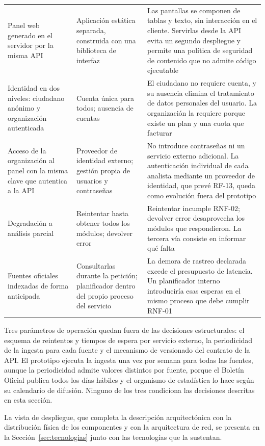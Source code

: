 \begin{small}
\begin{longtable}{@{}p{4cm} p{4.2cm} p{6cm}@{}}
  Panel web generado en el servidor por la misma API & Aplicación estática separada, construida con una biblioteca de interfaz & Las pantallas se componen de tablas y texto, sin interacción en el cliente. Servirlas desde la API evita un segundo despliegue y permite una política de seguridad de contenido que no admite código ejecutable \\
  Identidad en dos niveles: ciudadano anónimo y organización autenticada & Cuenta única para todos; ausencia de cuentas & El ciudadano no requiere cuenta, y su ausencia elimina el tratamiento de datos personales del usuario. La organización la requiere porque existe un plan y una cuota que facturar \\
  Acceso de la organización al panel con la misma clave que autentica a la API & Proveedor de identidad externo; gestión propia de usuarios y contraseñas & No introduce contraseñas ni un servicio externo adicional. La autenticación individual de cada analista mediante un proveedor de identidad, que prevé RF-13, queda como evolución fuera del prototipo \\
  Degradación a análisis parcial & Reintentar hasta obtener todos los módulos; devolver error & Reintentar incumple RNF-02; devolver error desaprovecha los módulos que respondieron. La tercera vía consiste en informar qué falta \\
  Fuentes oficiales indexadas de forma anticipada & Consultarlas durante la petición; planificador dentro del propio proceso del servicio & La demora de rastreo declarada excede el presupuesto de latencia. Un planificador interno introduciría esas esperas en el mismo proceso que debe cumplir RNF-01 \\
\end{longtable}
\end{small}

Tres parámetros de operación quedan fuera de las decisiones estructurales: el esquema de reintentos y tiempos de espera por servicio externo, la periodicidad de la ingesta para cada fuente y el mecanismo de versionado del contrato de la API. El prototipo ejecuta la ingesta una vez por semana para todas las fuentes, aunque la periodicidad admite valores distintos por fuente, porque el Boletín Oficial publica todos los días hábiles y el organismo de estadística lo hace según su calendario de difusión. Ninguno de los tres condiciona las decisiones descritas en esta sección.

La vista de despliegue, que completa la descripción arquitectónica con la distribución física de los componentes y con la arquitectura de red, se presenta en la Sección~\ref{sec:tecnologias} junto con las tecnologías que la sustentan.

